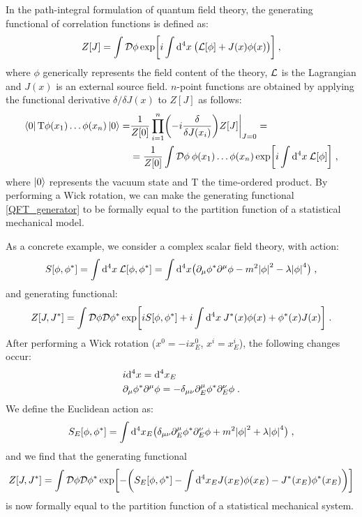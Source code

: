 In the path-integral formulation of quantum field theory, the generating functional of correlation functions is defined as:
\begin{equation}
Z[J] = \int \mathcal D \phi \exp \biggl[ i \int \mathrm{d}^4x \: \bigl( \mathcal L[\phi] + J(x)\phi(x) \bigr) \biggr] \: ,
\label{QFT_generator}
\end{equation}
%
where $\phi$ generically represents the field content of the theory, $\mathcal L$ is the Lagrangian and $J(x)$ is an external source field. $n$-point functions are obtained by applying the functional derivative $\delta / \delta J(x)$ to $Z[J]$ as follows:
\begin{equation}
\begin{split}
\bra{0} \mathrm T \phi(x_1) \dots \phi(x_n) \ket{0} = & \frac{1}{Z[0]} \prod_{i=1}^n \biggl( -i \frac{\delta}{\delta J(x_i)} \biggr) Z[J] \biggr\vert_{J=0} = \\
& = \frac{1}{Z[0]} \int \mathcal D \phi \: \phi(x_1) \dots \phi(x_n) \exp \biggl[ i \int \mathrm{d}^4x \: \mathcal L[\phi] \biggr] \; ,
\end{split}
\label{np_function}
\end{equation}
%
where $\ket{0}$ represents the vacuum state and T the time-ordered product.
By performing a Wick rotation, we can make the generating functional \ref{QFT_generator} to be formally equal to the partition function of a statistical mechanical model.

As a concrete example, we consider a complex scalar field theory, with action:
\begin{equation}
S[\phi,\phi^*] = \int \mathrm{d}^4x \: \mathcal L[\phi,\phi^*] = \int \mathrm{d}^4x \bigl( \partial_{\mu} \phi^* \partial^{\mu} \phi - m^2 \abs{\phi}^2 -\lambda \abs{\phi}^4 \bigr) \; ,
\end{equation}
%
and generating functional:
\begin{equation}
Z[J,J^*] = \int \mathcal D \phi \mathcal D \phi^* \exp \biggl[ i S[\phi,\phi^*] + i \int \mathrm{d}^4x \: J^*(x) \phi(x) + \phi^*(x) J(x) \biggr] \; .
\label{scalar_gen_functional}
\end{equation}
%
After performing a Wick rotation ($x^0 = -i x^0_E$, $x^i = x^i_E$), the following changes occur:
\begin{equation}
\begin{split}
& i\mathrm{d}^4x =  \mathrm{d}^4x_E \\
& \partial_{\mu} \phi^* \partial^{\mu} \phi = - \delta_{\mu\nu} \partial^{\mu}_E \phi^* \partial^{\nu}_E \phi \; .
\end{split}
\end{equation}
%
We define the Euclidean action as:
\begin{equation}
S_E[\phi,\phi^*] = \int \mathrm{d}^4x_E \bigl( \delta_{\mu\nu} \partial^{\mu}_E \phi^* \partial^{\nu}_E \phi + m^2 \abs{\phi}^2 + \lambda \abs{\phi}^4  \bigr) \; ,
\end{equation}
%
and we find that the generating functional
\begin{equation}
Z[J,J^*] = \int \mathcal D \phi \mathcal D \phi^* \exp \biggl[ - \biggl( S_E[\phi,\phi^*] - \int \mathrm{d}^4x_E J(x_E) \phi(x_E) - J^*(x_E) \phi^*(x_E) \biggr) \biggr] 
\end{equation}
%
is now formally equal to the partition function of a statistical mechanical system.

